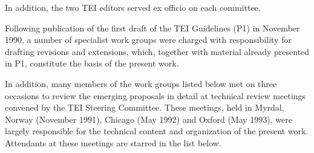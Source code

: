 In addition, the two TEI editors served ex officio on each committee.\par
Following publication of the first draft of the TEI Guidelines (P1) in November 1990, a number of specialist work groups were charged with responsibility for drafting revisions and extensions, which, together with material already presented in P1, constitute the basis of the present work.\par
In addition, many members of the work groups listed below met on three occasions to review the emerging proposals in detail at technical review meetings convened by the TEI Steering Committee. These meetings, held in Myrdal, Norway (November 1991), Chicago (May 1992) and Oxford (May 1993), were largely responsible for the technical content and organization of the present work. Attendants at these meetings are starred in the list below. \begin{description}


\end{description}
